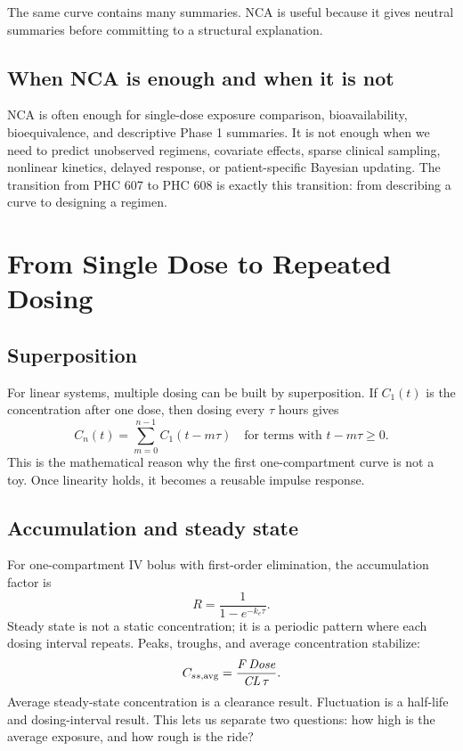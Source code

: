 \documentclass[a4paper]{article}
\newcommand{\pkCL}{\pksym{CL}}
\newcommand{\pkF}{\pksym{F}}
\newcommand{\pkCavg}{C_{ss,\pklab{avg}}}
\begin{document}
The same curve contains many summaries. NCA is useful because it gives neutral summaries before committing to a structural explanation.

\subsection{When NCA is enough and when it is not}

NCA is often enough for single-dose exposure comparison, bioavailability, bioequivalence, and descriptive Phase 1 summaries. It is not enough when we need to predict unobserved regimens, covariate effects, sparse clinical sampling, nonlinear kinetics, delayed response, or patient-specific Bayesian updating. The transition from PHC 607 to PHC 608 is exactly this transition: from describing a curve to designing a regimen.

\section{From Single Dose to Repeated Dosing}

\subsection{Superposition}

For linear systems, multiple dosing can be built by superposition. If \(C_1(t)\) is the concentration after one dose, then dosing every \(\tau\) hours gives
\[
  C_n(t)=\sum_{m=0}^{n-1} C_1(t-m\tau)
  \quad \text{for terms with }t-m\tau\ge 0.
\]
This is the mathematical reason why the first one-compartment curve is not a toy. Once linearity holds, it becomes a reusable impulse response.

\subsection{Accumulation and steady state}

For one-compartment IV bolus with first-order elimination, the accumulation factor is
\[
  R=\frac{1}{1-e^{-k_e\tau}}.
\]
Steady state is not a static concentration; it is a periodic pattern where each dosing interval repeats. Peaks, troughs, and average concentration stabilize:
\[
  \pkCavg=\frac{\pkF\,\pksym{Dose}}{\pkCL\,\tau}.
\]
Average steady-state concentration is a clearance result. Fluctuation is a half-life and dosing-interval result. This lets us separate two questions: how high is the average exposure, and how rough is the ride?
\end{document}
